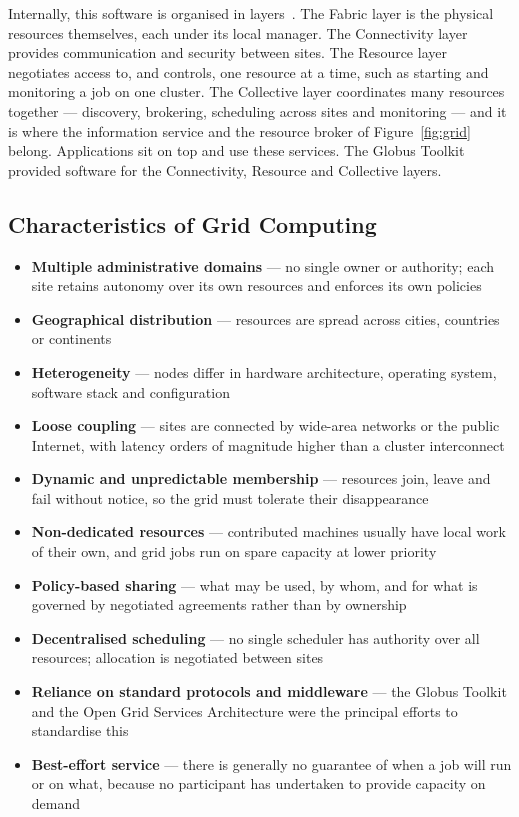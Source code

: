 \documentclass[../main.tex]{subfiles}
\begin{document}
Internally, this software is organised in layers~. The Fabric
layer is the physical resources themselves, each under its local manager. The
Connectivity layer provides communication and security between sites. The
Resource layer negotiates access to, and controls, one resource at a time,
such as starting and monitoring a job on one cluster. The Collective layer
coordinates many resources together --- discovery, brokering, scheduling
across sites and monitoring --- and it is where the information service and
the resource broker of Figure~\ref{fig:grid} belong. Applications sit on top
and use these services. The Globus Toolkit provided software for the
Connectivity, Resource and Collective layers.

\subsection{Characteristics of Grid Computing}

\begin{itemize}
  \item \textbf{Multiple administrative domains} --- no single owner or
        authority; each site retains autonomy over its own resources and
        enforces its own policies
  \item \textbf{Geographical distribution} --- resources are spread across
        cities, countries or continents
  \item \textbf{Heterogeneity} --- nodes differ in hardware architecture,
        operating system, software stack and configuration
  \item \textbf{Loose coupling} --- sites are connected by wide-area networks
        or the public Internet, with latency orders of magnitude higher than a
        cluster interconnect
  \item \textbf{Dynamic and unpredictable membership} --- resources join,
        leave and fail without notice, so the grid must tolerate their
        disappearance
  \item \textbf{Non-dedicated resources} --- contributed machines usually
        have local work of their own, and grid jobs run on spare capacity at
        lower priority
  \item \textbf{Policy-based sharing} --- what may be used, by whom, and for
        what is governed by negotiated agreements rather than by ownership
  \item \textbf{Decentralised scheduling} --- no single scheduler has
        authority over all resources; allocation is negotiated between sites
  \item \textbf{Reliance on standard protocols and middleware} --- the Globus
        Toolkit and the Open Grid Services Architecture were the principal
        efforts to standardise this
  \item \textbf{Best-effort service} --- there is generally no guarantee of
        when a job will run or on what, because no participant has undertaken
        to provide capacity on demand
\end{itemize}
\end{document}
